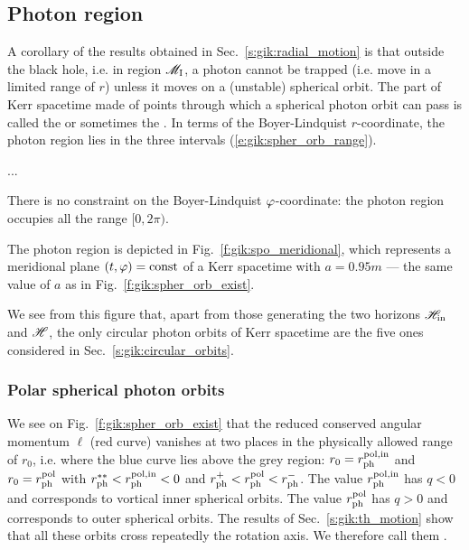 \subsection{Photon region}

A corollary of the results obtained in Sec.~\ref{s:gik:radial_motion}
is that outside the black hole, i.e. in region $\mathscr{M}_{\rm I}$, a photon
cannot be trapped (i.e. move in a limited range of $r$) unless it moves
on a (unstable) spherical orbit. The part of Kerr spacetime made of points
through which a spherical photon orbit can pass is called the
 or sometimes the  \cite{Johns_al20}. In terms of the Boyer-Lindquist $r$-coordinate, the photon region
lies in the three intervals (\ref{e:gik:spher_orb_range}).

...

There is no constraint on the Boyer-Lindquist $\varphi$-coordinate: the photon region occupies
all the range $[0, 2\pi)$.

The photon region is depicted in Fig.~\ref{f:gik:spo_meridional}, which represents
a meridional plane $(t,\varphi) = \mathrm{const}$ of a Kerr spacetime with $a=0.95 m$
--- the same value of $a$ as in Fig.~\ref{f:gik:spher_orb_exist}.

We see from this figure that, apart from those generating the two horizons $\mathscr{H}_{\rm in}$
and $\mathscr{H}$, the only circular photon orbits of Kerr spacetime are the
five ones considered in Sec.~\ref{s:gik:circular_orbits}.


\subsubsection{Polar spherical photon orbits}

We see on Fig.~\ref{f:gik:spher_orb_exist} that the reduced conserved
angular momentum $\ell$ (red curve) vanishes at two
places in the physically allowed range of $r_0$,
i.e. where the blue curve lies above the grey region:
$r_0=r_{\rm ph}^{\rm pol,in}$ and $r_0=r_{\rm ph}^{\rm pol}$
with $r_{\rm ph}^{**} < r_{\rm ph}^{\rm pol,in} < 0$ and
$r_{\rm ph}^+ < r_{\rm ph}^{\rm pol} < r_{\rm ph}^-$.
The value $r_{\rm ph}^{\rm pol,in}$ has $q<0$ and corresponds to
vortical inner spherical orbits.
The value $r_{\rm ph}^{\rm pol}$ has $q >0$
and corresponds to outer spherical orbits.
The results of Sec.~\ref{s:gik:th_motion} show that all these orbits cross
repeatedly the rotation axis. We therefore call them
.

